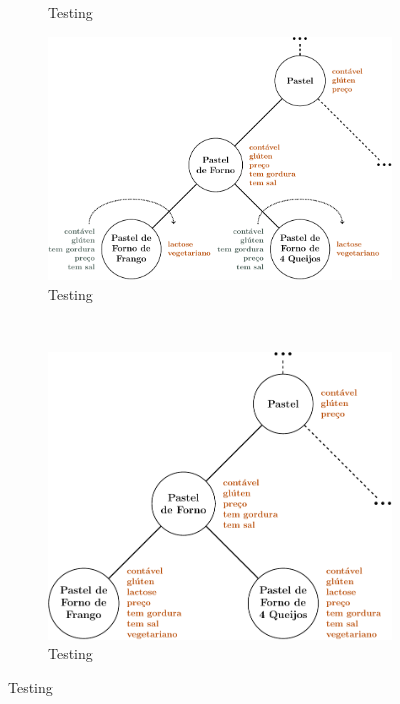\documentclass[10pt,a4paper]{article}
\begin{document}
\begin{figure}
\begin{subfigure}{0.49\linewidth}
			\caption{Testing}
		\end{subfigure}
		\begin{subfigure}{0.49\linewidth}
			\includegraphics[width=0.9\linewidth]{../topdown-4.pdf}
			\caption{Testing}
		\end{subfigure}
		\\
		\begin{subfigure}{0.49\linewidth}
			\includegraphics[width=0.9\linewidth]{../topdown-5.pdf}
			\caption{Testing}
		\end{subfigure}
	\end{figure}
\end{document}
